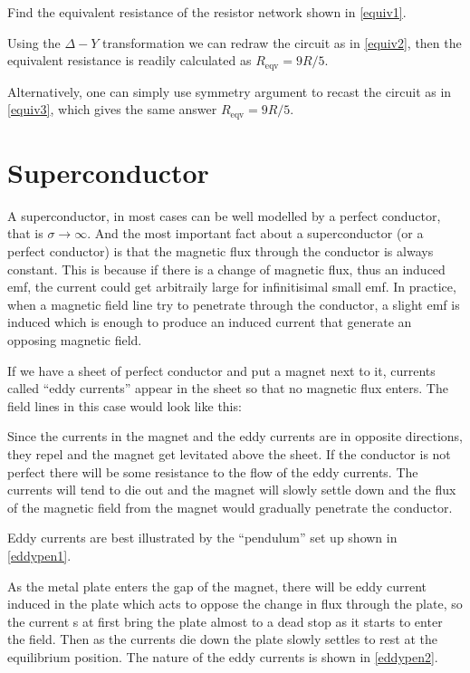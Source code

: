 \documentclass[english,a4paper,12pt]{report}
\begin{document}
{Find the equivalent resistance of the resistor network shown in \cref{equiv1}.}
{Using the \(\Delta -Y\) transformation we can redraw the circuit as in \cref{equiv2}, then the equivalent resistance is readily calculated as \(R_{\text{eqv} } = 9R/5 \). 

Alternatively, one can simply use symmetry argument to recast the circuit as in \cref{equiv3}, which gives the same answer \(R_{\text{eqv} } = 9R/5 \). } 


\section{Superconductor}

A superconductor, in most cases can be well modelled by a perfect conductor, that is \(\sigma \rightarrow \infty\). And the most important fact about a superconductor (or a perfect conductor) is that the magnetic flux through the conductor is always constant. This is because if there is a change of magnetic flux, thus an induced emf, the current could get arbitraily large for infinitisimal small emf. In practice, when a magnetic field line try to penetrate through the conductor, a slight emf is induced which is enough to produce an induced current that generate an opposing magnetic field.

If we have a sheet of perfect conductor and put a magnet next to it, currents called ``eddy currents'' appear in the sheet so that no magnetic flux enters. The field lines in this case would look like this:


Since the currents in the magnet and the eddy currents are in opposite directions, they repel and the magnet get levitated above the sheet. If the conductor is not perfect there will be some resistance to the flow of the eddy currents. The currents will tend to die out and the magnet will slowly settle down and the flux of the magnetic field from the magnet would gradually penetrate the conductor.

Eddy currents are best illustrated by the ``pendulum'' set up shown in \cref{eddypen1}.


As the metal plate enters the gap of the magnet, there will be eddy current induced in the plate which acts to oppose the change in flux through the plate, so the current s at first bring the plate almost to a dead stop as it starts to enter the field. Then as the currents die down the plate slowly settles to rest at the equilibrium position. The nature of the eddy currents is shown in \cref{eddypen2}.  
\end{document}
